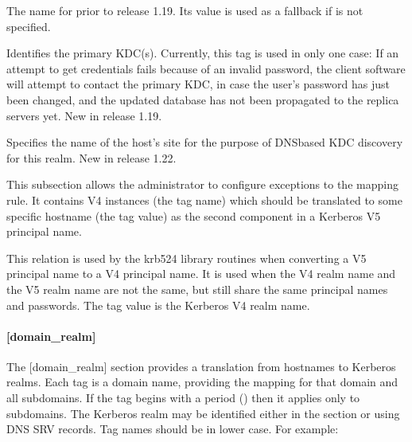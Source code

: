\documentclass[letterpaper,10pt,english]{sphinxmanual}
\begin{document}
\begin{description}
\sphinxAtStartPar
The name for  prior to release 1.19.  Its value is
used as a fallback if  is not specified.

\sphinxAtStartPar
Identifies the primary KDC(s).  Currently, this tag is used in only
one case: If an attempt to get credentials fails because of an
invalid password, the client software will attempt to contact the
primary KDC, in case the user’s password has just been changed, and
the updated database has not been propagated to the replica
servers yet.  New in release 1.19.

\sphinxAtStartPar
Specifies the name of the host’s site for the purpose of DNS\sphinxhyphen{}based
KDC discovery for this realm.  New in release 1.22.

\sphinxAtStartPar
This subsection allows the administrator to configure exceptions
to the  mapping rule.  It contains V4 instances
(the tag name) which should be translated to some specific
hostname (the tag value) as the second component in a Kerberos V5
principal name.

\sphinxAtStartPar
This relation is used by the krb524 library routines when
converting a V5 principal name to a V4 principal name.  It is used
when the V4 realm name and the V5 realm name are not the same, but
still share the same principal names and passwords. The tag value
is the Kerberos V4 realm name.

\end{description}


\paragraph{{[}domain\_realm{]}}
\label{\detokenize{admin/conf_files/krb5_conf:domain-realm}}\label{\detokenize{admin/conf_files/krb5_conf:id3}}
\sphinxAtStartPar
The {[}domain\_realm{]} section provides a translation from hostnames to
Kerberos realms.  Each tag is a domain name, providing the mapping for
that domain and all subdomains.  If the tag begins with a period
() then it applies only to subdomains.  The Kerberos realm may be
identified either in the {\hyperref[\detokenize{admin/conf_files/krb5_conf:realms}]{}} section or using DNS SRV records.
Tag names should be in lower case.  For example:
\end{document}
